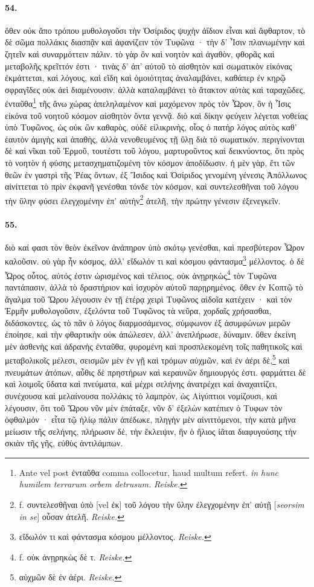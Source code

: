 \documentclass[a4paper, 11pt, oneside, polutonikogreek, german, landscape]{article}
\begin{document}
\paragraph{54.}
ὅθεν οὐκ ἄπο τρόπου μυθολογοῦσι τὴν Ὀσίριδος ψυχὴν ἀΐδιον εἶναι καὶ ἄφθαρτον, τὸ δὲ σῶμα πολλάκις διασπᾷν καὶ ἀφανίζειν τὸν Τυφῶνα · τὴν δ' Ἶσιν πλανωμένην καὶ ζητεῖν καὶ συναρμόττειν πάλιν. τὸ γὰρ ὂν καὶ νοητὸν καὶ ἀγαθὸν, φθορᾶς καὶ μεταβολῆς κρεῖττόν ἐστι · τινὰς δ' ἀπ' αὐτοῦ τὸ αἰσθητὸν καὶ σωματικὸν εἰκόνας ἐκμάττεται, καὶ λόγους, καὶ εἴδη καὶ ὁμοιότητας ἀναλαμβάνει, καθάπερ ἐν κηρῷ σφραγῖδες οὐκ ἀεὶ διαμένουσιν. ἀλλὰ καταλαμβάνει τὸ ἄτακτον αὐτὰς καὶ ταραχῶδες, ἐνταῦθα\footnote{Ante vel post ἐνταῦθα comma collocetur, haud multum refert. \emph{in hunc humilem terrarum orbem detrusum.} \emph{Reiske.}} τῆς ἄνω χώρας ἀπεληλαμένον καὶ μαχόμενον πρὸς τὸν Ὧρον, ὃν ἡ Ἶσις εἰκόνα τοῦ νοητοῦ κόσμον αἰσθητὸν ὄντα γεννᾷ. διὸ καὶ δίκην φεύγειν λέγεται νοθείας ὑπὸ Τυφῶνος, ὡς οὐκ ὢν καθαρὸς, οὐδὲ εἰλικρινὴς, οἷος ὁ πατὴρ λόγος αὐτὸς καθ' ἑαυτὸν ἀμιγὴς καὶ ἀπαθὴς, ἀλλὰ νενοθευμένος τῇ ὕλῃ διὰ τὸ σωματικόν. περιγίνονται δὲ καὶ νῖκαι τοῦ Ἑρμοῦ, τουτέστι τοῦ λόγου, μαρτυροῦντος καὶ δεικνύοντος, ὅτι πρὸς τὸ νοητὸν ἡ φύσης μετασχηματιζομένη τὸν κόσμον ἀποδίδωσιν. ἡ μὲν γὰρ, ἔτι τῶν θεῶν ἐν γαστρὶ τῆς Ῥέας ὄντων, ἐξ Ἴσιδος καὶ Ὀσίριδος γενομένη γένεσις Ἀπόλλωνος αἰνίττεται τὸ πρὶν ἐκφανῆ γενέσθαι τόνδε τὸν κόσμον, καὶ συντελεσθῆναι τοῦ λόγου τὴν ὕλην φύσει ἐλεγχομένην ἐπ' αὐτὴν\footnote{f. συντελεσθῆναι ὑπὸ [vel ἐκ] τοῦ λόγου τὴν ὕλην ἐλεγχομένην ἐπ' αὐτῇ [\emph{seorsim in se}] οὖσαν ἀτελῆ. \emph{Reiske.}} ἀτελῆ, τὴν πρώτην γένεσιν ἐξενεγκεῖν.

\paragraph{55.}
διὸ καί φασι τὸν θεὸν ἐκεῖνον ἀνάπηρον ὑπὸ σκότῳ γενέσθαι, καὶ πρεσβύτερον Ὧρον καλοῦσιν. οὐ γὰρ ἦν κόσμος, ἀλλ' εἴδωλόν τι καὶ κόσμου φάντασμα\footnote{εἴδωλόν τι καὶ φάντασμα κόσμου μέλλοντος. \emph{Reiske.}} μέλλοντος. ὁ δὲ Ὧρος οὗτος, αὐτός ἐστιν ὡρισμένος καὶ τέλειος, οὐκ ἀνῃρηκὼς\footnote{f. οὐκ ἀνῃρηκὼς δὲ τ. \emph{Reiske.}} τὸν Τυφῶνα παντάπασιν, ἀλλὰ τὸ δραστήριον καὶ ἰσχυρὸν αὐτοῦ παρῃρημένος. ὅθεν ἐν Κοπτῷ τὸ ἄγαλμα τοῦ Ὥρου λέγουσιν ἐν τῇ ἑτέρᾳ χειρὶ Τυφῶνος αἰδοῖα κατέχειν · καὶ τὸν Ἑρμῆν μυθολογοῦσιν, ἐξελόντα τοῦ Τυφῶνος τὰ νεῦρα, χορδαῖς χρήσασθαι, διδάσκοντες, ὡς τὸ πᾶν ὁ λόγος διαρμοσάμενος, σύμφωνον ἐξ ἀσυμφώνων μερῶν ἐποίησε, καὶ τὴν φθαρτικὴν οὐκ ἀπώλεσεν, ἀλλ' ἀνεπλήρωσε, δύναμιν. ὅθεν ἐκείνη μὲν ἀσθενὴς καὶ ἀδρανὴς ἐνταῦθα, φυρομένη καὶ προσπλεκομένη τοῖς παθητικοῖς καὶ μεταβολικοῖς μέλεσι, σεισμῶν μὲν ἐν γῇ καὶ τρόμων αὐχμῶν, καὶ ἐν ἀέρι δὲ,\footnote{αὐχμῶν δὲ ἐν ἀέρι. \emph{Reiske.}} καὶ πνευμάτων ἀτόπων, αὖθις δὲ πρηστήρων καὶ κεραυνῶν δημιουργός ἐστι. φαρμάττει δὲ καὶ λοιμοῖς ὕδατα καὶ πνεύματα, καὶ μέχρι σελήνης ἀνατρέχει καὶ ἀναχαιτίζει, συνέχουσα καὶ μελαίνουσα πολλάκις τὸ λαμπρὸν, ὡς Αἰγύπτιοι νομίζουσι, καὶ λέγουσιν, ὅτι τοῦ Ὥρου νῦν μὲν ἐπάταξε, νῦν δ' ἐξελὼν κατέπιεν ὁ Τυφων τὸν ὀφθαλμόν · εἶτα τῷ ἡλίῳ πάλιν ἀπέδωκε, πληγὴν μὲν αἰνιττόμενοι, τὴν κατὰ μῆνα μείωσιν τῆς σελήνης, πλήρωσιν δὲ, τὴν ἔκλειψιν, ἣν ὁ ἥλιος ἰᾶται διαφυγούσης τὴν σκιὰν τῆς γῆς, εὐθὺς ἀντιλάμπων.
\end{document}
